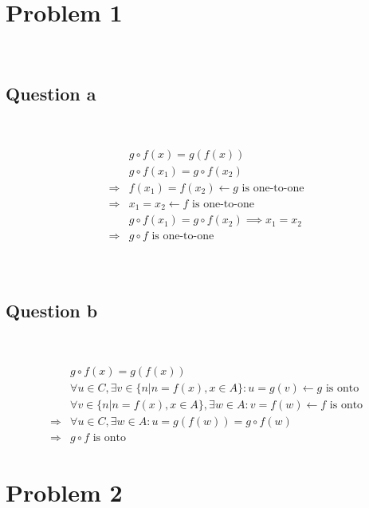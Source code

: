 \documentclass{article}
\begin{document}
\section*{Problem 1}

~

\subsection*{Question a}

~

\begin{equation*}
    \begin{split}
        &g\circ f(x)=g(f(x))\\
        &g\circ f(x_1)=g\circ f(x_2)\\
        \Rightarrow&f(x_1)=f(x_2)\leftarrow g\text{ is one-to-one}\\
        \Rightarrow&x_1=x_2 \leftarrow f\text{ is one-to-one}\\
        &g\circ f(x_1)=g\circ f(x_2)\implies x_1=x_2\\
        \Rightarrow&g\circ f \text{ is one-to-one}\\
    \end{split}
\end{equation*}

~

\subsection*{Question b}

~

\begin{equation*}
    \begin{split}
        &g\circ f(x)=g(f(x))\\
        &\forall u \in C , \exists v \in \{n|n=f(x),x\in A\} : u=g(v)\leftarrow g \text{ is onto}\\
        &\forall v \in \{n|n=f(x),x\in A\} , \exists w \in A : v=f(w)\leftarrow f \text{ is onto}\\
        \Rightarrow &\forall u \in C , \exists w \in A : u=g(f(w))=g\circ f(w)\\
        \Rightarrow &g \circ f \text{ is onto}
    \end{split}
\end{equation*}

\newpage

\section*{Problem 2}
\end{document}

